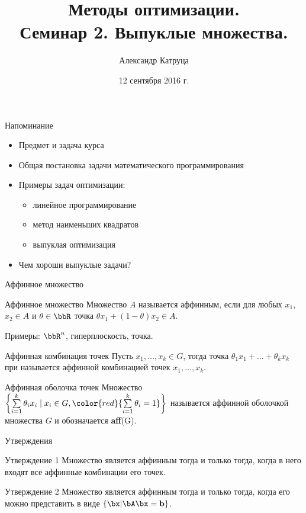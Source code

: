 \documentclass[12pt,russian]{beamer}
\title[Семинар 2]{Методы оптимизации. \\
Семинар 2. Выпуклые множества.}
\author{Александр Катруца}
\institute{Московский физико-технический институт,\\
Факультет Управления и Прикладной Математики}
\date{12 сентября 2016 г.}
\begin{document}
\begin{frame}
\maketitle
\end{frame}

\begin{frame}{Напоминание}

\begin{itemize}
\item Предмет и задача курса
\item Общая постановка задачи математического программирования
\item Примеры задач оптимизации: 
\begin{itemize}
\item линейное программирование
\item метод наименьших квадратов
\item выпуклая оптимизация
\end{itemize}
\item Чем хороши выпуклые задачи?
\end{itemize}
\end{frame}

\begin{frame}{Аффинное множество}
\small
\begin{block}{Аффинное множество}
Множество $A$ называется аффинным, если для любых $x_1$, $x_2 \in A$ и $\theta \in \bbR$ точка $\theta x_1 + (1 - \theta)x_2 \in A$.
\end{block}
Примеры: $\bbR^n$, гиперплоскость, точка.
\begin{block}{Аффинная комбинация точек}
Пусть $x_1, \ldots, x_k \in G$, тогда точка $\theta_1 x_1 + \ldots + \theta_k x_k$ при {} называется аффинной комбинацией точек $x_1,\ldots,x_k$.
\end{block}

\begin{block}{Аффинная оболочка точек}
Множество $\left\{ \sum\limits_{i=1}^k \theta_i x_i \; | \; x_i \in G, {\color{red}{\sum\limits_{i=1}^k \theta_i = 1}} \right\}$ называется аффинной оболочкой множества $G$ и обозначается \textbf{aff}(G).
\end{block}
\end{frame}

\begin{frame}{Утверждения}

\begin{block}{Утверждение 1}
Множество является аффинным тогда и только тогда, когда в него входят все аффинные комбинации его точек.
\end{block}

\begin{block}{Утверждение 2}
Множество является аффинным тогда и только тогда, когда его можно представить в виде $\{\bx | \bA\bx = \mathbf{b} \}$.
\end{block}
\end{frame}
\end{document}
